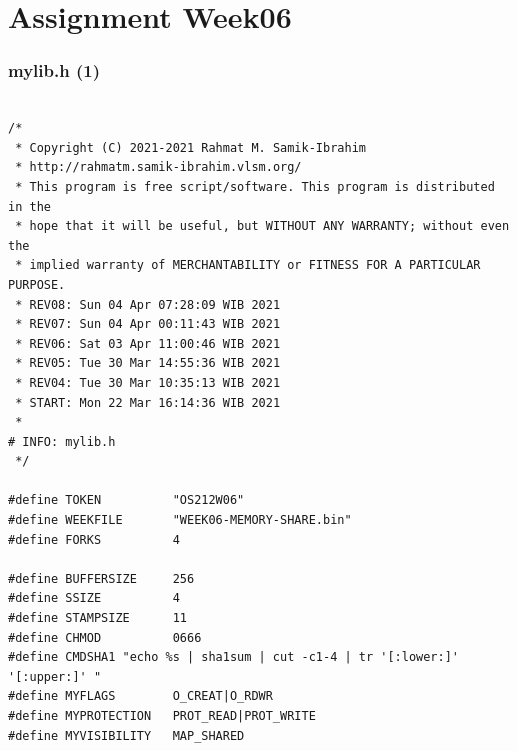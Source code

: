 \documentclass[xcolor=table, notheorems, hyperref={pdfpagelabels=false}]{beamer}
\begin{document}
\section{Assignment Week06}
\begin{frame}[fragile]
\frametitle{mylib.h (1)}
\begin{lstlisting}[basicstyle=\ttfamily\tiny]         % 108

/*
 * Copyright (C) 2021-2021 Rahmat M. Samik-Ibrahim
 * http://rahmatm.samik-ibrahim.vlsm.org/
 * This program is free script/software. This program is distributed in the
 * hope that it will be useful, but WITHOUT ANY WARRANTY; without even the
 * implied warranty of MERCHANTABILITY or FITNESS FOR A PARTICULAR PURPOSE.
 * REV08: Sun 04 Apr 07:28:09 WIB 2021
 * REV07: Sun 04 Apr 00:11:43 WIB 2021
 * REV06: Sat 03 Apr 11:00:46 WIB 2021
 * REV05: Tue 30 Mar 14:55:36 WIB 2021
 * REV04: Tue 30 Mar 10:35:13 WIB 2021
 * START: Mon 22 Mar 16:14:36 WIB 2021
 *
# INFO: mylib.h
 */

#define TOKEN          "OS212W06"
#define WEEKFILE       "WEEK06-MEMORY-SHARE.bin"
#define FORKS          4

#define BUFFERSIZE     256
#define SSIZE          4
#define STAMPSIZE      11
#define CHMOD          0666
#define CMDSHA1 "echo %s | sha1sum | cut -c1-4 | tr '[:lower:]' '[:upper:]' "
#define MYFLAGS        O_CREAT|O_RDWR
#define MYPROTECTION   PROT_READ|PROT_WRITE
#define MYVISIBILITY   MAP_SHARED

\end{lstlisting}
\end{frame}
\end{document}
